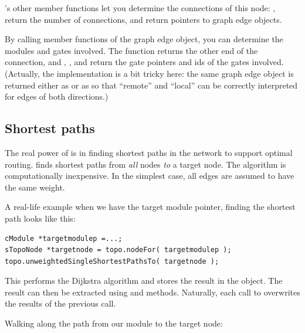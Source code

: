 's other member functions let you determine the
connections of this node: ,  return
the number of connections,  and
 return pointers to graph edge objects.


By calling member functions of the graph edge object, you can
determine the modules and gates involved. The 
function returns the other end of the connection, and
, ,  and
 return the gate pointers and ids of the gates
involved. (Actually, the implementation is a bit tricky here: the same
graph edge object  is returned either as
 or as  so that ``remote''
and ``local'' can be correctly interpreted for edges of both
directions.)





\subsection{Shortest paths}

The real power of  is in finding shortest
paths in the network to support optimal
routing.  finds shortest paths
from \textit{all} nodes \textit{to} a target node. The algorithm is
computationally inexpensive. In the simplest case, all edges are
assumed to have the same weight.

A real-life example when we have the target module pointer, finding
the shortest path looks like this:

\begin{verbatim}
cModule *targetmodulep =...;
sTopoNode *targetnode = topo.nodeFor( targetmodulep );
topo.unweightedSingleShortestPathsTo( targetnode );
\end{verbatim}


This performs the Dijkstra algorithm and
stores the result in the  object. The result can
then be extracted using  and
 methods.  Naturally, each call to
 overwrites the results of
the previous call.

Walking along the path from our module to the target node:

